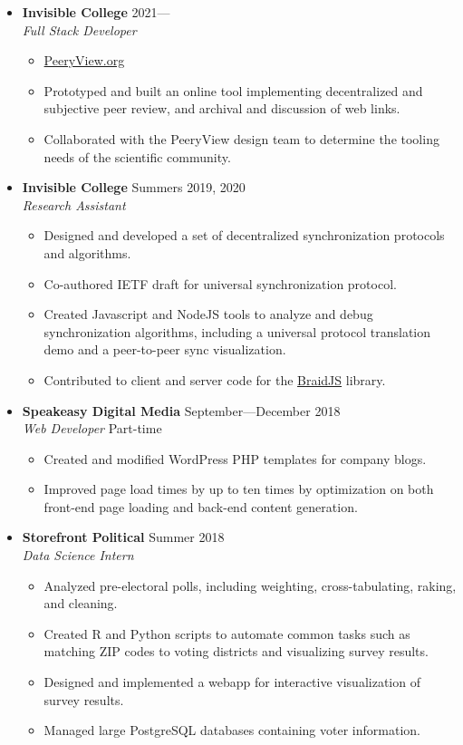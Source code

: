 \documentclass[12pt,letterpaper]{article}
\newenvironment{explist}
{\begin{itemize}[label=\textbf{--},itemsep=1pt,topsep=0pt,partopsep=0pt,parsep=0pt]}
{\end{itemize}}
\begin{document}
\begin{itemize}[label=]
    \item
    \textbf{Invisible College} \hfill 2021---\\
    \textit{Full Stack Developer}
    \begin{explist}
    \item \href{https://peeryview.org}{PeeryView.org}
        \item Prototyped and built an online tool implementing decentralized and subjective peer review, and archival and discussion of web links.
        \item Collaborated with the PeeryView design team to determine the tooling needs of the scientific community.
    \end{explist}
    \item
	\textbf{Invisible College} \hfill Summers 2019, 2020\\
	\textit{Research Assistant}
	\begin{explist}
		\item Designed and developed a set of decentralized synchronization protocols and algorithms.
		\item Co-authored IETF draft for universal synchronization protocol.
		\item Created Javascript and NodeJS tools to analyze and debug synchronization algorithms, including a universal protocol translation demo and a peer-to-peer sync visualization.
        \item Contributed to client and server code for the \href{https://github.com/braid-work/braidjs}{BraidJS} library.
	\end{explist}

	\item
	\textbf{Speakeasy Digital Media} \hfill September---December 2018\\
	\textit{Web Developer} \hfill Part-time
	\begin{explist}
		\item Created and modified WordPress PHP templates for company blogs.
		\item Improved page load times by up to ten times by optimization on both front-end page loading and back-end content generation.
	\end{explist}
	
	\item
	\textbf{Storefront Political} \hfill Summer 2018\\
	\textit{Data Science Intern}
	\begin{explist}
		\item Analyzed pre-electoral polls, including weighting, cross-tabulating, raking, and cleaning.
		\item Created R and Python scripts to automate common tasks such as matching ZIP codes to voting districts and visualizing survey results.
		\item Designed and implemented a webapp for interactive visualization of survey results.
		\item Managed large PostgreSQL databases containing voter information.
	\end{explist}


\end{itemize}
\end{document}
